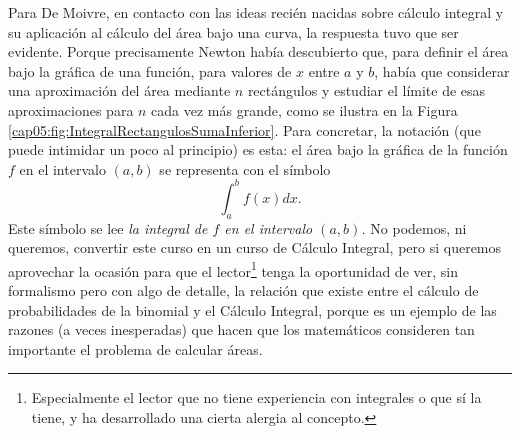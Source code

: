 Para De Moivre, en contacto con las ideas recién nacidas sobre cálculo integral y su aplicación al cálculo del área bajo una curva, la respuesta tuvo que ser evidente. Porque precisamente Newton había descubierto que, para definir el área bajo la gráfica de una función, para valores de $x$ entre $a$ y $b$, había que considerar una aproximación del área mediante $n$ rectángulos y estudiar el límite de esas aproximaciones para $n$ cada vez más grande, como se ilustra en la Figura \ref{cap05:fig:IntegralRectangulosSumaInferior}. Para concretar, la notación (que puede intimidar un poco al principio) es esta: el área bajo la gráfica de la función $f$ en el intervalo $(a,b)$ se representa con el símbolo
\[\int_a^b f(x)dx.\]
Este símbolo se lee {\em la integral de $f$ en el intervalo $(a,b)$.} No podemos, ni queremos, convertir este curso en un curso de Cálculo Integral, pero si queremos aprovechar la ocasión para que el lector\footnote{Especialmente el lector que no tiene experiencia con integrales o que sí la tiene, y ha desarrollado una cierta alergia al concepto.} tenga la oportunidad de ver, sin formalismo pero con algo de detalle, la relación que existe entre el cálculo de probabilidades de la binomial y el Cálculo Integral, porque es un ejemplo de las razones (a veces inesperadas) que hacen que los matemáticos consideren tan importante el problema de calcular áreas.
